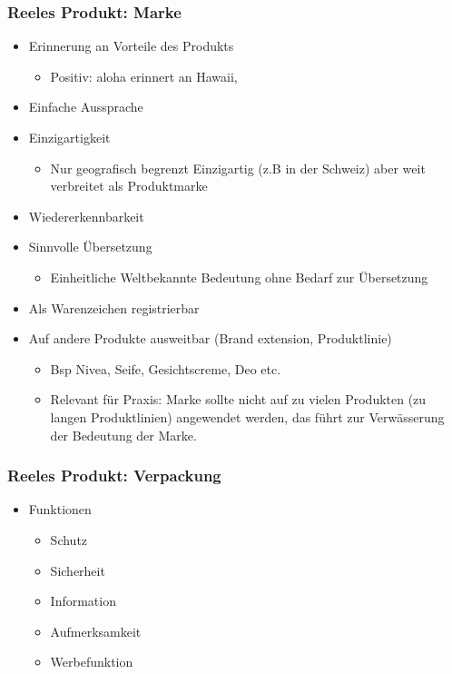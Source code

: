 \documentclass[a4paper]{article}
\begin{document}
    \subsubsection{Reeles Produkt: Marke}
    \begin{itemize}
        \item Erinnerung an Vorteile des Produkts 
        \begin{itemize}
            \item Positiv: aloha erinnert an Hawaii, 
        \end{itemize}
        \item Einfache Aussprache
        \item Einzigartigkeit
        \begin{itemize}
            \item Nur geografisch begrenzt Einzigartig (z.B in der Schweiz) aber weit verbreitet als Produktmarke
        \end{itemize}
        \item Wiedererkennbarkeit
        \item Sinnvolle Übersetzung 
        \begin{itemize}
            \item Einheitliche Weltbekannte Bedeutung ohne Bedarf zur Übersetzung
        \end{itemize}
        \item Als Warenzeichen registrierbar
        \item Auf andere Produkte ausweitbar (Brand extension, Produktlinie)
        \begin{itemize}
            \item Bsp Nivea, Seife, Gesichtscreme, Deo etc.
            \item Relevant für Praxis: Marke sollte nicht auf zu vielen Produkten (zu langen Produktlinien) angewendet werden, das führt zur Verwässerung der Bedeutung der Marke.
        \end{itemize}
    \end{itemize}

    \subsubsection{Reeles Produkt: Verpackung}
    \begin{itemize}
        \item Funktionen
        \begin{itemize}
            \item Schutz
            \item Sicherheit
            \item Information
            \item Aufmerksamkeit
            \item Werbefunktion
        \end{itemize}
    \end{itemize}
\end{document}
